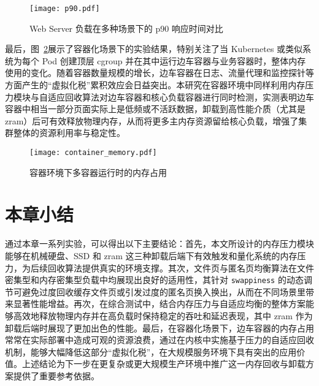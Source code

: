 \begin{figure}[h]
    \centering
    \texttt{[image: p90.pdf]}
    \caption{Web Server 负载在多种场景下的 p90 响应时间对比}
    \label{fig:p90}
\end{figure}

最后，图~\ref{fig:container_memory}展示了容器化场景下的实验结果，特别关注了当 Kubernetes 或类似系统为每个 Pod 创建顶层 cgroup 并在其中运行边车容器与业务容器时，整体内存使用的变化。随着容器数量规模的增长，边车容器在日志、流量代理和监控探针等方面产生的“虚拟化税”累积效应会日益突出。本研究在容器环境中同样利用内存压力模块与自适应回收算法对边车容器和核心负载容器进行同时检测，实测表明边车容器中相当一部分页面实际上是低频或不活跃数据，卸载到高性能介质（尤其是 zram）后可有效释放物理内存，从而将更多主内存资源留给核心负载，增强了集群整体的资源利用率与稳定性。

\begin{figure}[h]
    \centering
    \texttt{[image: container\_memory.pdf]}
    \caption{容器环境下多容器运行时的内存占用}
    \label{fig:container_memory}
\end{figure}

\section{本章小结}

通过本章一系列实验，可以得出以下主要结论：首先，本文所设计的内存压力模块能够在机械硬盘、SSD 和 zram 这三种卸载后端下有效触发和量化系统的内存压力，为后续回收算法提供真实的环境支撑。其次，文件页与匿名页均衡算法在文件密集型和内存密集型负载中均展现出良好的适用性，其针对 \texttt{swappiness} 的动态调节可避免过度回收缓存文件页或引发过度的匿名页换入换出，从而在不同场景里带来显著性能增益。再次，在综合测试中，结合内存压力与自适应均衡的整体方案能够高效地释放物理内存并在高负载时保持稳定的吞吐和延迟表现，其中 zram 作为卸载后端时展现了更加出色的性能。最后，在容器化场景下，边车容器的内存占用常常在实际部署中造成可观的资源浪费，通过在内核中实施基于压力的自适应回收机制，能够大幅降低这部分“虚拟化税”，在大规模服务环境下具有突出的应用价值。上述结论为下一步在更复杂或更大规模生产环境中推广这一内存回收与卸载方案提供了重要参考依据。
